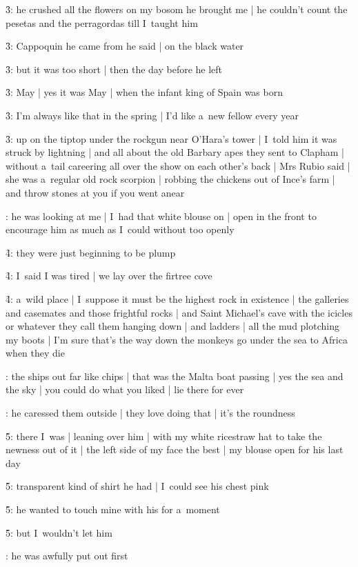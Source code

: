 \f3:
he crushed all the flowers on my bosom he brought me |
he couldn't count the pesetas and the perragordas till I~taught him

\f3:
Cappoquin he came from he said |
on the black water

\f3:
but it was too short |
then the day before he left

\f3:
May |
yes it was May |
when the infant king of Spain was born

\f3:
I'm always like that in the spring |
I'd like a~new fellow every year

\f3:
up on the tiptop under the rockgun near O'Hara's tower |
I~told him it was struck by lightning |
and all about the old Barbary apes they sent to Clapham |
without a~tail careering all over the show on each other's back |
Mrs Rubio said |
she was a~regular old rock scorpion |
robbing the chickens out of Ince's farm |
and throw stones at you if you went anear

:
he was looking at me |
I~had that white blouse on |
open in the front to encourage him as much as I~could without too openly

\f4:
they were just beginning to be plump

\f4:
I~said I was tired |
we lay over the firtree cove

\f4:
a~wild place |
I~suppose it must be the highest rock in existence |
the galleries and casemates and those frightful rocks |
and Saint Michael's cave with the icicles or whatever they call them hanging down |
and ladders |
all the mud plotching my boots |
I'm sure that's the way down the monkeys go under the sea to Africa when they die

:
the ships out far like chips |
that was the Malta boat passing |
yes the sea and the sky |
you could do what you liked |
lie there for ever

:
he caressed them outside |
they love doing that |
it's the roundness

\f5:
there I~was |
leaning over him |
with my white ricestraw hat to take the newness out of it |
the left side of my face the best |
my blouse open for his last day

\f5:
transparent kind of shirt he had |
I~could see his chest pink

\f5:
he wanted to touch mine with his for a~moment

\f5:
but I~wouldn't let him

:
he was awfully put out first

